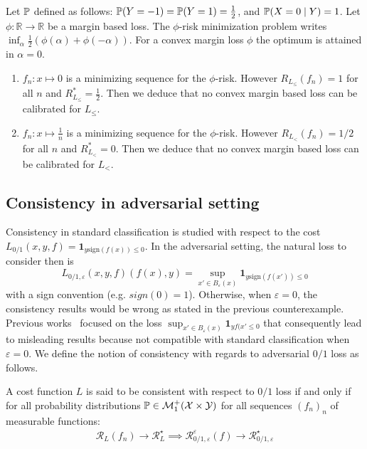 \begin{counterexample*}
Let $\mathbb{P}$ defined as follows: $\mathbb{P}(Y=-1)=\mathbb{P}(Y=1)=\frac12$, and $\mathbb{P}(X=0\mid Y)=1$. Let $\phi:\mathbb{R}\to\mathbb{R}$ be a margin based loss. The $\phi$-risk minimization problem writes $\inf_{\alpha} \frac{1}{2} (\phi(\alpha)+\phi(-\alpha))$. For a convex margin loss $\phi$ the optimum is attained in $\alpha=0$. 
\begin{enumerate}
    \item $f_n:x\mapsto 0$ is a minimizing sequence for the $\phi$-risk. However $R_{L_{\leq}}(f_n)=1$ for all $n$ and $R_{L_{\leq}}^*=\frac{1}{2}$. Then we deduce that no convex margin based loss can be calibrated for $L_{\leq}$.
    \item $f_n:x\mapsto \frac{1}{n}$ is a minimizing sequence for the $\phi$-risk. However $R_{L_{<}}(f_n)=1/2$ for all $n$ and $R_{L_{<}}^*=0$. Then we deduce that no convex margin based loss can be calibrated for $L_{<}$.
\end{enumerate}

\end{counterexample*}



\subsection{Consistency in adversarial setting}


Consistency in standard classification is studied with respect to the cost $L_{0/1}(x,y,f)=\mathbf{1}_{y\text{sign}(f(x))\leq 0}$. In the adversarial setting, the natural loss to consider then is  $$L_{0/1,\varepsilon}(x,y,f)(f(x),y)=\sup_{x'\in B_\varepsilon(x)}\mathbf{1}_{y\text{sign}(f(x'))\leq 0}$$ 
with a sign convention (e.g. $sign(0)=1$). Otherwise, when $\varepsilon=0$, the consistency results would be wrong as stated in the previous counterexample. Previous works~\citep{XXX} focused on the loss $\sup_{x'\in B_\varepsilon(x)}\mathbf{1}_{yf(x'\leq 0}$ that consequently lead to misleading results because not compatible with standard classification when $\varepsilon=0$. We define the notion of consistency with regards to adversarial $0/1$ loss as follows.
\begin{definition}
A cost function $L$ is said to be consistent with respect to $0/1$ loss if and only if for all probability distributions $\mathbb{P}\in\mathcal{M}_1^+(\mathcal{X}\times\mathcal{Y})$ for all sequences $(f_n)_n $ of measurable functions:
\begin{align}
    \mathcal{R}_{L}(f_n)\to \mathcal{R}_{L}^\star\implies\mathcal{R}^\varepsilon_{0/1,\varepsilon}(f)\to \mathcal{R}_{0/1,\varepsilon}^\star
\end{align}
\end{definition}

